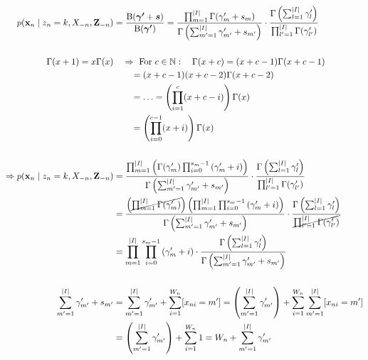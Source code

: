 \begin{enumerate}
    \begin{align*}
        p(\xn \mid  z_n = k, X_{-n}, \Zmn) &= \frac{\operatorname{B}(\boldsymbol{\gamma'}+ \boldsymbol{s})}{\operatorname{B}(\boldsymbol{\gamma'})} = \frac{\prod_{m=1}^{\vert I \vert} \Gamma(\gamma'_m + s_m)}{\Gamma\left(\sum_{m'=1}^{\vert I \vert} \gamma'_{m'} + s_{m'}\right)} \cdot \frac{\Gamma\left(\sum_{l=1}^{\vert I \vert} \gamma'_l\right)}{\prod_{l'=1}^{\vert I\vert} \Gamma(\gamma'_{l'})} 
        \\\\
        \Gamma(x+1) = x\Gamma(x) &\quad \Rightarrow \text{ For } c \in \mathbb{N}: \quad \Gamma(x+c) = (x+c-1)\Gamma(x+c-1) \\
        & \qquad  = (x+c-1)(x+c-2)\Gamma(x+c-2) \\
        & \qquad = \ldots = \left(\prod_{i=1}^c(x+c-i)\right) \Gamma(x) \\
        & \qquad = \left(\prod_{i=0}^{c-1}(x+i)\right) \Gamma(x)
        \\\\
        \Rightarrow p(\xn \mid  z_n = k, X_{-n}, \Zmn) &= \frac{\prod_{m=1}^{\vert I \vert} \left(\Gamma(\gamma'_m) \prod_{i=0}^{s_m-1}\left(\gamma'_m + i\right)\right)}{\Gamma\left(\sum_{m'=1}^{\vert I \vert} \gamma'_{m'} + s_{m'}\right)} \cdot \frac{\Gamma\left(\sum_{l=1}^{\vert I \vert} \gamma'_l\right)}{\prod_{l'=1}^{\vert I\vert} \Gamma(\gamma'_{l'})} 
        \\
        &= \frac{\left(\cancel{\prod_{m=1}^{\vert I \vert} \Gamma(\gamma'_m)}\right) \left(\prod_{m=1}^{\vert I \vert}\prod_{i=0}^{s_m-1}\left(\gamma'_m + i\right)\right)}{\Gamma\left(\sum_{m'=1}^{\vert I \vert} \gamma'_{m'} + s_{m'} \right)} \cdot \frac{\Gamma\left(\sum_{l=1}^{\vert I \vert} \gamma'_l\right)}{\cancel{\prod_{l'=1}^{\vert I\vert} \Gamma(\gamma'_{l'})}}
        \\
        &= \prod_{m=1}^{\vert I \vert}\prod_{i=0}^{s_m-1}\left(\gamma'_m + i\right) \cdot \frac{\Gamma\left(\sum_{l=1}^{\vert I \vert} \gamma'_l\right)}{\Gamma\left(\sum_{m'=1}^{\vert I \vert} \gamma'_{m'} + s_{m'}\right)} 
        \\\\
        \sum_{m'=1}^{\vert I \vert} \gamma'_{m'} + s_{m'} &= \sum_{m'=1}^{\vert I \vert} \gamma'_{m'} + \sum_{i=1}^{W_n}[x_{ni} = m'] = \left(\sum_{m'=1}^{\vert I \vert} \gamma'_{m'}\right) + \sum_{i=1}^{W_n}\sum_{m'=1}^{\vert I \vert}[x_{ni} = m']\\
        &= \left(\sum_{m'=1}^{\vert I \vert} \gamma'_{m'} \right) + \sum_{i=1}^{W_n}1 = W_n + \sum_{m'=1}^{\vert I \vert} \gamma'_{m'}

\end{align*}
\end{enumerate}
